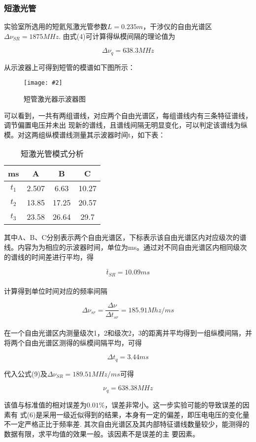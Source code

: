 \documentclass[12pt,a4paper]{article}
\newcommand{\be}[1]{
    \begin{equation}
        #1
    \end{equation}
}
\newcommand{\bfig}[3]{
    \begin{figure}[H]
        \centering
        \texttt{[image: \#2]}
        \caption{#3}
    \end{figure}
}
\begin{document}
\subsubsection{短激光管}
实验室所选用的短氦氖激光管参数$L=0.235m$，干涉仪的自由光谱区$\Delta \nu_{SR}=1875MHz$. 由式(4)可计算得纵模间隔的理论值为
\be{\Delta \nu_q=638.3MHz}
从示波器上可得到短管的模谱如下图所示：
\bfig{0.6}{短管激光器示意图.jpeg}{短管激光器示波器图}
可以看到，一共有两组谱线，对应两个自由光谱区，每组谱线内有三条特征谱线，调节偏置电压并未出
现新的谱线，且谱线间隔无明显变化，可以判定该谱线为纵模。对这两组纵模谱线测量其示波器时间t，如下表：
\begin{table}[htbp]
    \centering
    \caption{短激光管模式分析}
    \begin{tabular}{|c|c|c|c|}
    \hline

    ms  &A  &B  &C  \\ \hline
    $t_1$    &2.507  &6.63   &10.27\\ \hline
    $t_2$    &13.85  &17.25  &20.57\\ \hline
    $t_3$    &23.58  &26.64  &29.7\\ \hline
    \end{tabular}
    \end{table}
其中A、B、C分别表示两个自由光谱区，下标表示该自由光谱区内对应级次的谱线。内容为为相应的示波器时间，单位为ms。通过对不同自由光谱区内相同级次的谱线的时间差进行平均，得
\be{\bar{t}_{SR} = 10.09\unit{ms}}\\
计算得到单位时间对应的频率间隔
\be{\Delta \nu_{sr} =\frac{\Delta \nu}{\Delta t_{sr}}= 185.91 \unit{Mhz\per ms}}\\
在一个自由光谱区内测量级次1，2和级次2，3的距离并平均得到一组纵模间隔，并将两个自由光谱区测得的纵模间隔平均，可得
\be{\Delta t_q = 3.44ms}
代入公式(9)及$\Delta \nu_{SR}=189.51 \unit{MHz\per ms}$可得
\be{\nu_q=638.38MHz}
该值与标准值的相对误差为$0.01\%$，误差非常小。这一步实验可能的导致误差的因素有
式(6)是采用一级近似得到的结果，本身有一定的偏差，即压电电压的变化量不一定严格正比于频率差.
其次自由光谱区及其内部特征谱线数量较少，能测得的数据有限，求平均值的效果一般。该因素不是误差的主
要因素。
\end{document}
